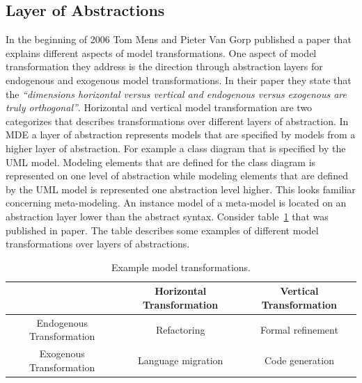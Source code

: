 


\subsection{Layer of Abstractions}

In the beginning of 2006 Tom Mens and Pieter Van Gorp published a
paper\cite{Mens2006} that explains different aspects of model transformations.
One aspect of model transformation they address is the direction through
abstraction layers for endogenous and exogenous model transformations. In their
paper they state that the \textit{``dimensions horizontal versus vertical and
endogenous versus exogenous are truly orthogonal''}\cite{Mens2006}. Horizontal
and vertical model transformation are two categorizes that describes
transformations over different layers of abstraction. In MDE a layer of
abstraction represents models that are specified by models from a higher layer
of abstraction. For example a class diagram that is specified by the UML model.
Modeling elements that are defined for the class diagram is represented on one
level of abstraction while modeling elements that are defined by the UML model
is represented one abstraction level higher. This looks familiar concerning
meta-modeling. An instance model of a meta-model is located on an abstraction
layer lower than the abstract syntax. Consider table~\ref{tab:directions_mt}
that was published in paper\cite{Mens2006}. The table describes some examples
of different model transformations over layers of abstractions.

\begin{table}[ht]
\renewcommand*\arraystretch{1.2}
\centering
\begin{tabular}{| c | c | c |}
\hline

& Horizontal Transformation & Vertical Transformation \\ [0.5ex] 
\hline
Endogenous Transformation & Refactoring & Formal refinement \\ [0.5ex] 
Exogenous Transformation & Language migration & Code generation \\ [0.5ex]
 
\hline
\end{tabular}
\caption{Example model transformations.}
\label{tab:directions_mt}
\end{table} 

